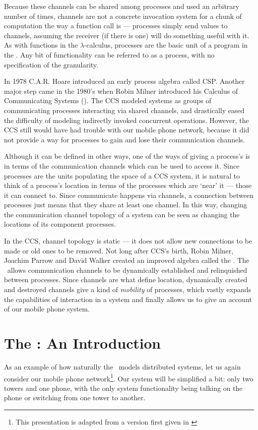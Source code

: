Because these channels can be shared among processes and used an arbitrary number of times, channels are not a concrete invocation system for a chunk of computation the way a function call is ---  processes simply send values to channels, assuming the receiver (if there is one) will do something useful with it.  
As with functions in the $\lambda$-calculus, processes are the basic unit of a program in the \picalc. 
Any bit of functionality can be referred to as a process, with no specification of the granularity.

In 1978 C.A.R. Hoare introduced an early process algebra called CSP.  Another major step came in the 1980's when Robin Milner introduced his Calculus of Communicating Systems (\!).  
 The CCS modeled systems as groups of communicating processes interacting via shared channels, and drastically eased the difficulty of modeling indirectly invoked concurrent operations.  
However, the CCS still would have had trouble with our mobile phone network, because it did not provide a way for processes to gain and lose their communication channels.  

	Although it can be defined in other ways, one of the ways of giving a process's\emph{} is in terms of the communication channels which can be used to access it.  
Since processes are the units populating the space of a CCS system, it is natural to think of a process's location in terms of the processes which are `near' it ---  those it can connect to.  
Since communicate happens via channels, a connection between processes just means that they share at least one channel.  
In this way, changing the communication channel topology of a system can be seen as changing the locations of its component processes.  

	In the CCS, channel topology is static ---  it does not allow new connections to be made or old ones to be removed.  
Not long after CCS's birth, Robin Milner, Joachim Parrow and David Walker created an improved algebra called the \inidx{\picalc}.  
The \picalc\ allows communication channels to be dynamically established and relinquished between processes.  
Since channels are what define location, dynamically created and destroyed channels give a kind of \emph{mobility} of processes, which vastly expands the capabilities of interaction in a system and finally allows us to give an account of our mobile phone system.
\section{The \picalc: An Introduction}	
	As an example of how naturally the \picalc\ models distributed systems, let us again consider our mobile phone network\footnote{This presentation is adapted from a version first given in \cite{miln99}}.  
Our system will be simplified a bit: only two towers and one phone, with the only system functionality being talking on the phone or switching from one tower to another.
	
